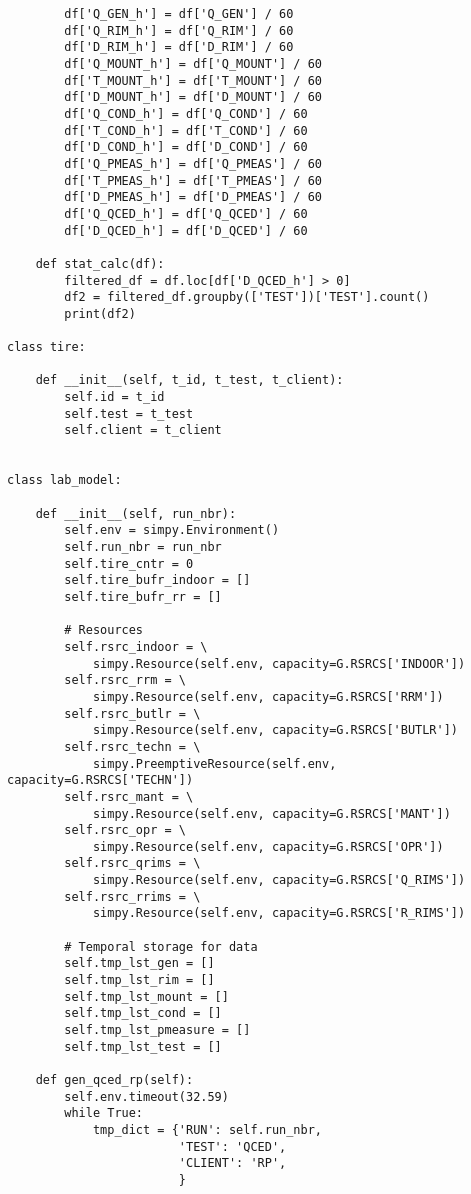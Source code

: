 \begin{verbatim}
        df['Q_GEN_h'] = df['Q_GEN'] / 60
        df['Q_RIM_h'] = df['Q_RIM'] / 60
        df['D_RIM_h'] = df['D_RIM'] / 60
        df['Q_MOUNT_h'] = df['Q_MOUNT'] / 60
        df['T_MOUNT_h'] = df['T_MOUNT'] / 60
        df['D_MOUNT_h'] = df['D_MOUNT'] / 60
        df['Q_COND_h'] = df['Q_COND'] / 60
        df['T_COND_h'] = df['T_COND'] / 60
        df['D_COND_h'] = df['D_COND'] / 60
        df['Q_PMEAS_h'] = df['Q_PMEAS'] / 60
        df['T_PMEAS_h'] = df['T_PMEAS'] / 60
        df['D_PMEAS_h'] = df['D_PMEAS'] / 60
        df['Q_QCED_h'] = df['Q_QCED'] / 60
        df['D_QCED_h'] = df['D_QCED'] / 60

    def stat_calc(df):
        filtered_df = df.loc[df['D_QCED_h'] > 0]
        df2 = filtered_df.groupby(['TEST'])['TEST'].count()
        print(df2)

class tire:

    def __init__(self, t_id, t_test, t_client):
        self.id = t_id
        self.test = t_test
        self.client = t_client


class lab_model:

    def __init__(self, run_nbr):
        self.env = simpy.Environment()
        self.run_nbr = run_nbr
        self.tire_cntr = 0
        self.tire_bufr_indoor = []
        self.tire_bufr_rr = []

        # Resources
        self.rsrc_indoor = \
            simpy.Resource(self.env, capacity=G.RSRCS['INDOOR'])
        self.rsrc_rrm = \
            simpy.Resource(self.env, capacity=G.RSRCS['RRM'])
        self.rsrc_butlr = \
            simpy.Resource(self.env, capacity=G.RSRCS['BUTLR'])
        self.rsrc_techn = \
            simpy.PreemptiveResource(self.env, capacity=G.RSRCS['TECHN'])
        self.rsrc_mant = \
            simpy.Resource(self.env, capacity=G.RSRCS['MANT'])
        self.rsrc_opr = \
            simpy.Resource(self.env, capacity=G.RSRCS['OPR'])
        self.rsrc_qrims = \
            simpy.Resource(self.env, capacity=G.RSRCS['Q_RIMS'])
        self.rsrc_rrims = \
            simpy.Resource(self.env, capacity=G.RSRCS['R_RIMS'])

        # Temporal storage for data
        self.tmp_lst_gen = []
        self.tmp_lst_rim = []
        self.tmp_lst_mount = []
        self.tmp_lst_cond = []
        self.tmp_lst_pmeasure = []
        self.tmp_lst_test = []

    def gen_qced_rp(self):
        self.env.timeout(32.59)
        while True:
            tmp_dict = {'RUN': self.run_nbr,
                        'TEST': 'QCED',
                        'CLIENT': 'RP',
                        }


\end{verbatim}
